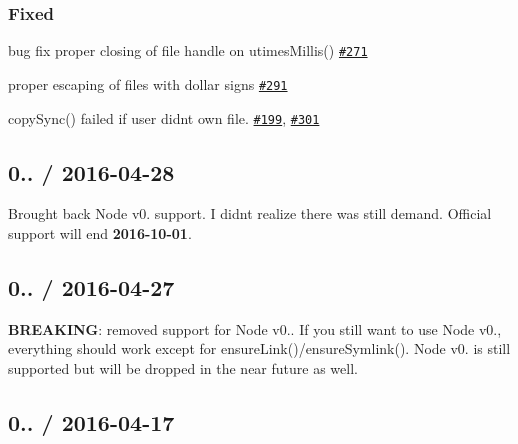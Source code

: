 \subsubsection*{Fixed}


\begin{DoxyItemize}
\item bug fix proper closing of file handle on {\ttfamily utimes\+Millis()} \href{https://github.com/jprichardson/node-fs-extra/issues/271}{\tt \#271}
\item proper escaping of files with dollar signs \href{https://github.com/jprichardson/node-fs-extra/pull/291}{\tt \#291}
\item {\ttfamily copy\+Sync()} failed if user didn\textquotesingle{}t own file. \href{https://github.com/jprichardson/node-fs-extra/issues/199}{\tt \#199}, \href{https://github.com/jprichardson/node-fs-extra/pull/301}{\tt \#301}
\end{DoxyItemize}

\subsection*{0.. / 2016-\/04-\/28 }


\begin{DoxyItemize}
\item Brought back Node v0. support. I didn\textquotesingle{}t realize there was still demand. Official support will end {\bfseries 2016-\/10-\/01}.
\end{DoxyItemize}

\subsection*{0.. / 2016-\/04-\/27 }


\begin{DoxyItemize}
\item {\bfseries B\+R\+E\+A\+K\+I\+NG}\+: removed support for Node v0.. If you still want to use Node v0., everything should work except for {\ttfamily ensure\+Link()/ensure\+Symlink()}. Node v0. is still supported but will be dropped in the near future as well.
\end{DoxyItemize}

\subsection*{0.. / 2016-\/04-\/17 }


